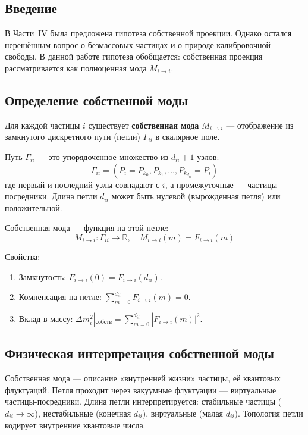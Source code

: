 \documentclass[12pt,a4paper]{article}
\begin{document}
\subsection{Введение}
В Части~IV была предложена гипотеза собственной проекции. Однако остался нерешённым вопрос о безмассовых частицах и о природе калибровочной свободы. В данной работе гипотеза обобщается: собственная проекция рассматривается как полноценная мода $M_{i \to i}$.

\subsection{Определение собственной моды}
Для каждой частицы $i$ существует \textbf{собственная мода} $M_{i \to i}$ --- отображение из замкнутого дискретного пути (петли) $\Gamma_{ii}$ в скалярное поле.

Путь $\Gamma_{ii}$ --- это упорядоченное множество из $d_{ii} + 1$ узлов:
\begin{equation}
    \Gamma_{ii} = (P_i = P_{k_0}, P_{k_1}, \dots, P_{k_{d_{ii}}} = P_i)
\end{equation}
где первый и последний узлы совпадают с $i$, а промежуточные --- частицы-посредники. Длина петли $d_{ii}$ может быть нулевой (вырожденная петля) или положительной.

Собственная мода --- функция на этой петле:
\begin{equation}
    M_{i \to i}: \Gamma_{ii} \to \mathbb{R}, \quad M_{i \to i}(m) = F_{i \to i}(m)
\end{equation}

Свойства:
\begin{enumerate}[label=(\arabic*)]
    \item Замкнутость: $F_{i \to i}(0) = F_{i \to i}(d_{ii})$.
    \item Компенсация на петле: $\sum_{m=0}^{d_{ii}} F_{i \to i}(m) = 0$.
    \item Вклад в массу: $\Delta m_i^2|_{\text{собств}} = \sum_{m=0}^{d_{ii}} |F_{i \to i}(m)|^2$.
\end{enumerate}

\subsection{Физическая интерпретация собственной моды}
Собственная мода --- описание «внутренней жизни» частицы, её квантовых флуктуаций. Петля проходит через вакуумные флуктуации --- виртуальные частицы-посредники. Длина петли интерпретируется: стабильные частицы ($d_{ii} \to \infty$), нестабильные (конечная $d_{ii}$), виртуальные (малая $d_{ii}$). Топология петли кодирует внутренние квантовые числа.
\end{document}
